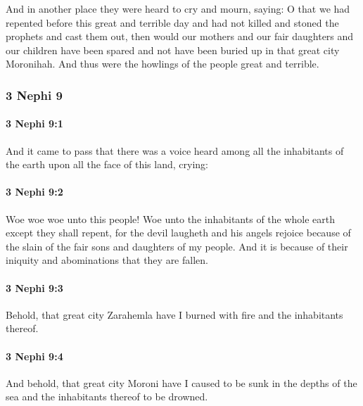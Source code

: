 			And in another place they were heard to cry and mourn, saying:
			O that we had repented before this great and terrible day
			and had not killed and stoned the prophets and cast them out,
			then would our mothers and our fair daughters and our children have been spared
			and not have been buried up in that great city Moronihah.
			And thus were the howlings of the people great and terrible.

	\subsubsection{3 Nephi 9} %
		\label{3NEPHI-9}
		
		\paragraph{3 Nephi 9:1} %
			\label{3NEPHI-9-1}

			And it came to pass that there was a voice heard
			among all the inhabitants of the earth upon all the face of this land, crying:

		\paragraph{3 Nephi 9:2} %
			\label{3NEPHI-9-2}

			Woe woe woe unto this people!
			Woe unto the inhabitants of the whole earth except they shall repent,
			for the devil laugheth and his angels rejoice
			because of the slain of the fair sons and daughters of my people.
			And it is because of their iniquity and abominations that they are fallen.

		\paragraph{3 Nephi 9:3} %
			\label{3NEPHI-9-3}

			Behold, that great city Zarahemla have I burned with fire
			and the inhabitants thereof.

		\paragraph{3 Nephi 9:4} %
			\label{3NEPHI-9-4}

			And behold, that great city Moroni have I caused
			to be sunk in the depths of the sea
			and the inhabitants thereof to be drowned.

